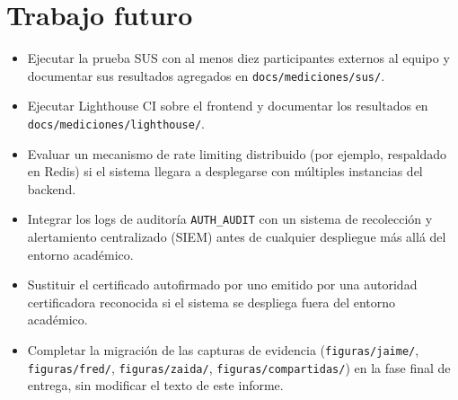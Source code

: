 \section{Trabajo futuro}
\begin{itemize}[nosep]
  \item Ejecutar la prueba SUS con al menos diez participantes externos al
    equipo y documentar sus resultados agregados en
    \texttt{docs/mediciones/sus/}.
  \item Ejecutar Lighthouse CI sobre el frontend y documentar los
    resultados en \texttt{docs/mediciones/lighthouse/}.
  \item Evaluar un mecanismo de rate limiting distribuido (por ejemplo,
    respaldado en Redis) si el sistema llegara a desplegarse con
    m\'ultiples instancias del backend.
  \item Integrar los logs de auditor\'ia \texttt{AUTH_AUDIT} con un
    sistema de recolecci\'on y alertamiento centralizado (SIEM) antes de
    cualquier despliegue m\'as all\'a del entorno acad\'emico.
  \item Sustituir el certificado autofirmado por uno emitido por una
    autoridad certificadora reconocida si el sistema se despliega fuera
    del entorno acad\'emico.
  \item Completar la migraci\'on de las capturas de evidencia
    (\texttt{figuras/jaime/}, \texttt{figuras/fred/},
    \texttt{figuras/zaida/}, \texttt{figuras/compartidas/}) en la fase
    final de entrega, sin modificar el texto de este informe.
\end{itemize}
